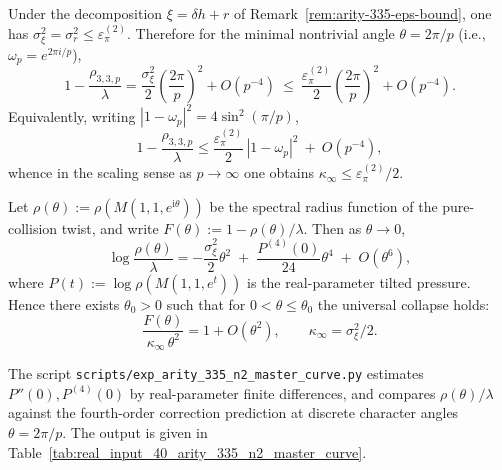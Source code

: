 

\begin{remark}\label{cor:arity-335-eps-trig-bound}
Under the decomposition \(\xi=\delta h+r\) of Remark~\ref{rem:arity-335-eps-bound}, one has \(\sigma_\xi^2=\sigma_r^2\le \varepsilon_\pi^{(2)}\).
Therefore for the minimal nontrivial angle \(\theta=2\pi/p\) (i.e., \(\omega_p=e^{2\pi i/p}\)),
$$
1-\frac{\rho_{3,3,p}}{\lambda}
=
\frac{\sigma_\xi^2}{2}\left(\frac{2\pi}{p}\right)^2+O(p^{-4})
\ \le\
\frac{\varepsilon_\pi^{(2)}}{2}\left(\frac{2\pi}{p}\right)^2+O(p^{-4}).
$$
Equivalently, writing \(|1-\omega_p|^2=4\sin^2(\pi/p)\),
$$
1-\frac{\rho_{3,3,p}}{\lambda}
\le
\frac{\varepsilon_\pi^{(2)}}{2}\,|1-\omega_p|^2\ +\ O(p^{-4}),
$$
whence in the scaling sense as \(p\to\infty\) one obtains \(\kappa_\infty\le \varepsilon_\pi^{(2)}/2\).
\end{remark}

\begin{remark}\label{prop:arity-335-master-curve}
Let \(\rho(\theta):=\rho(M(1,1,e^{\mathrm{i}\theta}))\) be the spectral radius function of the pure-collision twist, and write
\(
F(\theta):=1-\rho(\theta)/\lambda
\).
Then as \(\theta\to 0\),
$$
\log\frac{\rho(\theta)}{\lambda}
=
-\frac{\sigma_\xi^2}{2}\theta^2
\;+\;
\frac{P^{(4)}(0)}{24}\theta^4
\;+\;
O(\theta^6),
$$
where \(P(t):=\log\rho(M(1,1,e^{t}))\) is the real-parameter tilted pressure.
Hence there exists \(\theta_0>0\) such that for \(0<\theta\le \theta_0\) the universal collapse holds:
$$
\frac{F(\theta)}{\kappa_\infty\,\theta^2}=1+O(\theta^2),
\qquad
\kappa_\infty=\sigma_\xi^2/2.
$$
\end{remark}

\begin{remark}[Reproducible verification: master-curve comparison at discrete character points \texorpdfstring{$\theta=2\pi/p$}{theta=2pi/p}]\label{rem:arity-335-master-curve-check}
The script \texttt{scripts/exp\_arity\_335\_n2\_master\_curve.py} estimates \(P''(0),P^{(4)}(0)\) by real-parameter finite differences, and compares \(\rho(\theta)/\lambda\) against the fourth-order correction prediction at discrete character angles \(\theta=2\pi/p\). The output is given in Table~\ref{tab:real_input_40_arity_335_n2_master_curve}.
\end{remark}

